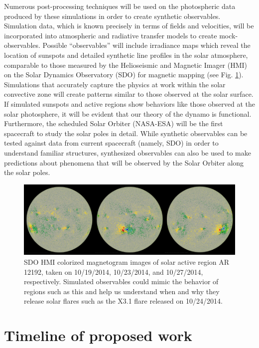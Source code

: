 \documentclass[aasms,12pt]{article}
\begin{document}
Numerous post-processing techniques will be used on the photospheric data 
produced by these simulations in order to create synthetic observables.
Simulation data, which is known precisely in terms of fields and velocities, 
will be incorporated into atmospheric and radiative transfer models to create
mock-observables.  Possible ``observables'' will
include irradiance maps which reveal the location of sunspots and 
detailed synthetic line profiles in the solar atmosphere, 
comparable to those measured by the Helioseismic and
Magnetic Imager (HMI) on the Solar Dynamics Observatory (SDO) for magnetic 
mapping (see Fig. \ref{AR12192}).  Simulations
that accurately capture the physics at work within the solar convective zone
will create patterns similar to those observed at the solar surface.  If
simulated sunspots and active regions show behaviors like those observed at the
solar photosphere, it will be evident that our
theory of the dynamo is functional.  
Furthermore, the scheduled Solar Orbiter (NASA-ESA)
will be the first spacecraft to study the solar poles in detail.  While
synthetic observables can be tested against data from
current spacecraft (namely, SDO)
in order to understand familiar structures, synthesized
observables can also be used to make predictions about phenomena that will be
observed by the Solar Orbiter along the solar poles. 

\begin{figure}[t!]
\centering
\includegraphics[width=14cm]{figs/2014_oct_sunspots.jpg}
\caption{SDO HMI colorized magnetogram images of solar active region AR 12192, taken
	on 10/19/2014, 10/23/2014, and 10/27/2014, respectively.  Simulated
	observables could mimic the behavior of regions such as this and help
	us understand when and why they release solar flares such as the X3.1
	flare released on 10/24/2014.
	\label{AR12192}}
\end{figure}

\section{Timeline of proposed work}
\end{document}
